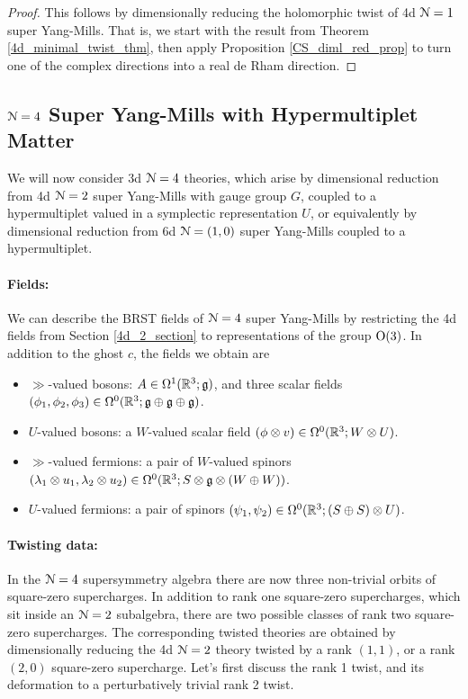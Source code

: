 \documentclass[10pt, oneside]{article}
\begin{document}
\begin{proof}
This follows by dimensionally reducing the holomorphic twist of 4d $\mathcal{N}=1$ super Yang-Mills.  That is, we start with the result from Theorem \ref{4d_minimal_twist_thm}, then apply Proposition \ref{CS_diml_red_prop} to turn one of the complex directions into a real de Rham direction.
\end{proof}

\subsection{\texorpdfstring{$\mathcal N = 4$}{N=4} Super Yang-Mills with Hypermultiplet Matter} \label{3d_4_section}
We will now consider 3d $\mathcal{N}=4$ theories, which arise by dimensional reduction from 4d $\mathcal{N}=2$ super Yang-Mills with gauge group $G$, coupled to a hypermultiplet valued in a symplectic representation $U$, or equivalently by dimensional reduction from 6d $\mathcal{N}=(1,0)$ super Yang-Mills coupled to a hypermultiplet.

\vspace{-10pt}
\paragraph{Fields:} We can describe the BRST fields of $\mathcal{N}=4$ super Yang-Mills by restricting the 4d fields from Section \ref{4d_2_section} to representations of the group $\mathrm{O}(3)$.  In addition to the ghost $c$, the fields we obtain are
\begin{itemize}
 \item $\gg$-valued bosons: $A \in \Omega^1(\mathbb R^3; \mathfrak{g})$, and three scalar fields $(\phi_1,\phi_2,\phi_3) \in \Omega^0(\mathbb R^3; \mathfrak{g} \oplus \mathfrak{g} \oplus \mathfrak{g})$.
 \item $U$-valued bosons: a $W$-valued scalar field $(\phi \otimes v) \in \Omega^0(\mathbb R^3; W \otimes U)$.
 \item $\gg$-valued fermions: a pair of $W$-valued spinors $(\lambda_1 \otimes u_1, \lambda_2 \otimes u_2) \in \Omega^0(\mathbb R^3 ; S \otimes \mathfrak{g} \otimes (W \oplus W))$.
 \item $U$-valued fermions:  a pair of spinors $(\psi_1,\psi_2) \in \Omega^0(\mathbb R^3; (S\oplus S) \otimes U)$.
\end{itemize}

\vspace{-10pt}
\paragraph{Twisting data:}
In the $\mathcal{N}=4$ supersymmetry algebra there are now three non-trivial orbits of square-zero supercharges.  In addition to rank one square-zero supercharges, which sit inside an $\mathcal{N}=2$ subalgebra, there are two possible classes of rank two square-zero supercharges.  The corresponding twisted theories are obtained by dimensionally reducing the 4d $\mathcal{N}=2$ theory twisted by a rank $(1,1)$, or a rank $(2,0)$ square-zero supercharge.  Let's first discuss the rank 1 twist, and its deformation to a perturbatively trivial rank 2 twist.
\end{document}

